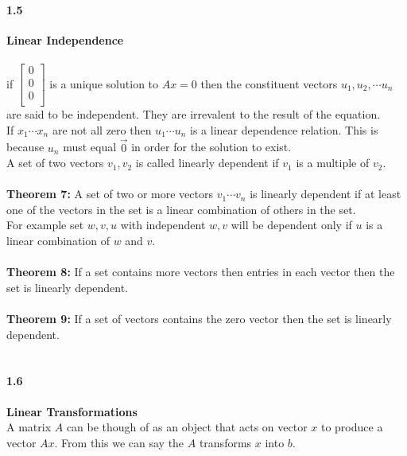\documentclass[14pt]{extreport}
\begin{document}
\paragraph{1.5}\textbf{Linear Independence}\\\\

if $\begin{bmatrix} 0\\ 0\\ 0\\ \end{bmatrix}$ is a unique solution to $Ax=0$ then the constituent vectors $u_1, u_2, \cdots u_n$ are said to be independent. They are irrevalent to the result of the equation.\\ 


If $x_1 \cdots x_n$ are not all zero then $u_1 \cdots u_n$ is a linear dependence relation. This is because $u_n$ must equal $\vec{0}$ in order for the solution to exist.\\


A set of two vectors ${v_1, v_2}$ is called linearly dependent if $v_1$ is a multiple of $v_2$.\\\\

\textbf{Theorem 7:} A set of two or more vectors ${v_1 \cdots v_n}$ is linearly dependent if at least one of the vectors in the set is a linear combination of others in the set.\\

For example set ${w, v, u}$ with independent $w ,v$ will be dependent only if $u$ is a linear combination of $w$ and $v$.\\\\


\textbf{Theorem 8:} If a set contains more vectors then entries in each vector then the set is linearly dependent.\\\\

\textbf{Theorem 9:} If a set of vectors contains the zero vector then the set is linearly dependent.\\\\


\paragraph{1.6}\textbf{Linear Transformations}\\

A matrix $A$ can be though of as an object that acts on vector $x$ to produce a vector $Ax$. From this we can say the $A$ transforms $x$ into $b$.\\
\end{document}
